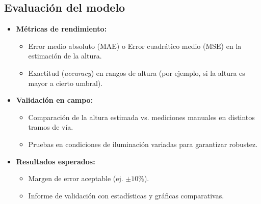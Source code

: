 \documentclass[
11pt, %
]{ProyectoVpC}
\begin{document}
\subsection{Evaluación del modelo}
\begin{itemize}
  \item \textbf{Métricas de rendimiento:}
    \begin{itemize}
      \item Error medio absoluto (MAE) o Error cuadrático medio (MSE) en la estimación de la altura.
      \item Exactitud (\emph{accuracy}) en rangos de altura (por ejemplo, si la altura es mayor a cierto umbral).
    \end{itemize}
  \item \textbf{Validación en campo:}
    \begin{itemize}
      \item Comparación de la altura estimada vs. mediciones manuales en distintos tramos de vía.
      \item Pruebas en condiciones de iluminación variadas para garantizar robustez.
    \end{itemize}
  \item \textbf{Resultados esperados:}
    \begin{itemize}
      \item Margen de error aceptable (ej. $\pm 10\%$).
      \item Informe de validación con estadísticas y gráficas comparativas.
    \end{itemize}
\end{itemize}
\end{document}
